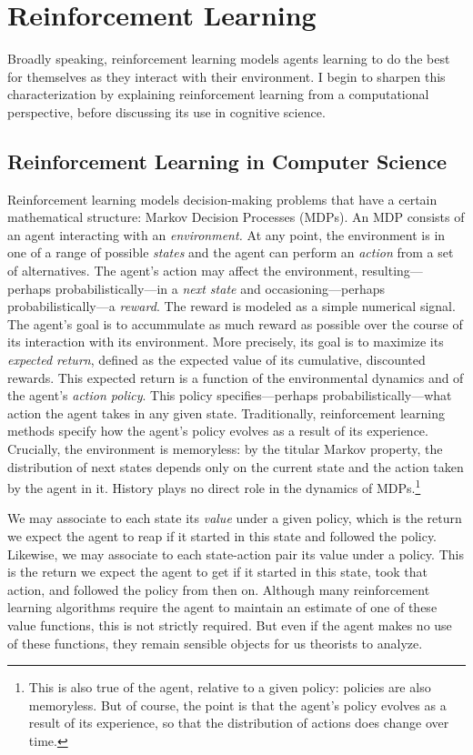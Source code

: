 \section{Reinforcement Learning}

Broadly speaking, reinforcement learning models agents learning to do the best for themselves as they interact with their environment.
I begin to sharpen this characterization by explaining reinforcement learning from a computational perspective, before discussing its use in cognitive science.

\subsection{Reinforcement Learning in Computer Science}

Reinforcement learning models decision-making problems that have a certain mathematical structure: Markov Decision Processes (MDPs).
An MDP consists of an agent interacting with an \emph{environment.}
At any point, the environment is in one of a range of possible \emph{states} and the agent can perform an \emph{action} from a set of alternatives.
The agent's action may affect the environment, resulting---perhaps probabilistically---in a \emph{next state} and occasioning---perhaps probabilistically---a \emph{reward}.
The reward is modeled as a simple numerical signal.
The agent's goal is to accummulate as much reward as possible over the course of its interaction with its environment.
More precisely, its goal is to maximize its \emph{expected return}, defined as the expected value of its cumulative, discounted rewards.
This expected return is a function of the environmental dynamics and of the agent's \emph{action policy}.
This policy specifies---perhaps probabilistically---what action the agent takes in any given state.
Traditionally, reinforcement learning methods specify how the agent's policy evolves as a result of its experience.
Crucially, the environment is memoryless: by the titular Markov property, the distribution of next states depends only on the current state and the action taken by the agent in it.
History plays no direct role in the dynamics of MDPs.\footnote{This is also true of the agent, relative to a given policy: policies are also memoryless. But of course, the point is that the agent's policy evolves as a result of its experience, so that the distribution of actions does change over time.}

We may associate to each state its \emph{value} under a given policy, which is the return we expect the agent to reap if it started in this state and followed the policy.
Likewise, we may associate to each state-action pair its value under a policy.
This is the return we expect the agent to get if it started in this state, took that action, and followed the policy from then on.
Although many reinforcement learning algorithms require the agent to maintain an estimate of one of these value functions, this is not strictly required.
But even if the agent makes no use of these functions, they remain sensible objects for us theorists to analyze.

